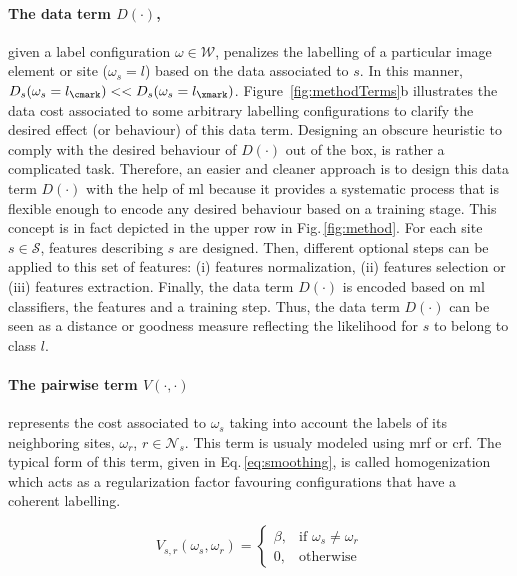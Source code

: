 \paragraph{The data term $D(\cdot)$,} \label{sec:method:dataTerm}
given a label configuration $\omega \in \mathcal{W}$, penalizes the labelling of a particular image element or site ($\omega_s = l$) based on the data associated to $s$.
In this manner, $D_s(\omega_s=l_\cmark) << D_s(\omega_s=l_\xmark)$.
Figure~\ref{fig:methodTerms}b illustrates the data cost associated to some arbitrary labelling configurations to clarify the desired effect (or behaviour) of this data term.
Designing an obscure heuristic to comply with the desired behaviour of $D(\cdot)$ out of the box, is rather a complicated task.
Therefore, an easier and cleaner approach is to design this data term $D(\cdot)$ with the help of \ac{ml} because it provides a systematic process that is flexible enough to encode any desired behaviour based on a training stage.
This concept is in fact depicted in the upper row in Fig.\,\ref{fig:method}.
For each site $s \in \mathcal{S}$, features describing $s$ are designed. Then, different optional steps can be applied to this set of features: (i) features normalization, (ii) features selection or (iii) features extraction. Finally, the data term $D(\cdot)$ is encoded based on \ac{ml} classifiers, the features and a training step.
Thus, the data term $D(\cdot)$ can be seen as a distance or goodness measure reflecting the likelihood for $s$ to belong to class $l$.

\paragraph{The pairwise term $V(\cdot,\cdot)$} \label{sec:method:mrfTerm}
represents the cost associated to $\omega_s$ taking into account the labels of its neighboring sites, $\omega_r$, $r \in \mathcal{N}_{s}$.
This term is usualy modeled using \ac{mrf} or \ac{crf}.
The typical form of this term, given in Eq.\,\eqref{eq:smoothing}, is called homogenization which acts as a regularization factor favouring configurations that have a coherent labelling.

\begin{equation}
V_{s,r}(\omega_s,\omega_r) =
\begin{cases}
    \beta, & \text{if } \omega_s \ne \omega_r\\
    0,              & \text{otherwise}
\end{cases}
\label{eq:smoothing}
\end{equation}


